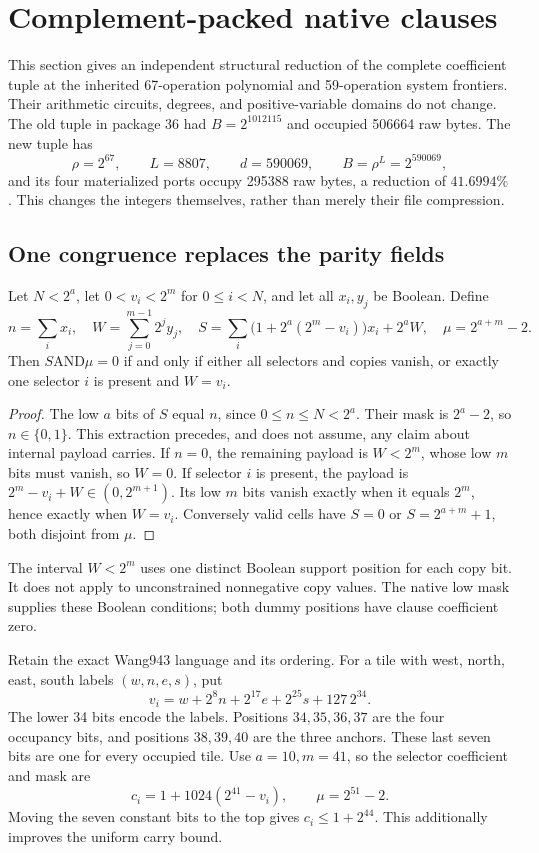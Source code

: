 \section{Complement-packed native clauses}
\label{sec:complement-native}
This section gives an independent structural reduction of the complete
coefficient tuple at the inherited 67-operation polynomial and
59-operation system frontiers.  Their arithmetic circuits, degrees, and
positive-variable domains do not change.  The old tuple in package 36 had
$B=2^{1012115}$ and occupied 506664 raw bytes.  The new tuple has
\[
 \rho=2^{67},\qquad L=8807,\qquad d=590069,\qquad B=\rho^L=2^{590069},
\]
and its four materialized ports occupy 295388 raw bytes, a reduction of
$41.6994\%$.  This changes the integers themselves, rather than merely
their file compression.

\subsection{One congruence replaces the parity fields}
\begin{lemma}
Let $N<2^a$, let $0<v_i<2^m$ for $0\le i<N$, and let all $x_i,y_j$
be Boolean.  Define
\[
 n=\sum_i x_i,\quad W=\sum_{j=0}^{m-1}2^j y_j,\quad
 S=\sum_i\bigl(1+2^a(2^m-v_i)\bigr)x_i+2^aW,
 \quad \mu=2^{a+m}-2.
\]
Then $S\mathbin{\mathrm{AND}}\mu=0$ if and only if either all selectors
and copies vanish, or exactly one selector $i$ is present and $W=v_i$.
\end{lemma}
\begin{proof}
The low $a$ bits of $S$ equal $n$, since $0\le n\le N<2^a$.
Their mask is $2^a-2$, so $n\in\{0,1\}$.  This extraction precedes,
and does not assume, any claim about internal payload carries.
If $n=0$, the remaining payload is $W<2^m$, whose low $m$ bits must
vanish, so $W=0$.  If selector $i$ is present, the payload is
$2^m-v_i+W\in(0,2^{m+1})$.  Its low $m$ bits vanish exactly when it
equals $2^m$, hence exactly when $W=v_i$.  Conversely valid cells have
$S=0$ or $S=2^{a+m}+1$, both disjoint from $\mu$.
\end{proof}
The interval $W<2^m$ uses one distinct Boolean support position for each
copy bit.  It does not apply to unconstrained nonnegative copy values.
The native low mask supplies these Boolean conditions; both dummy
positions have clause coefficient zero.

Retain the exact Wang943 language and its ordering.  For a tile with
west, north, east, south labels $(w,n,e,s)$, put
\[
 v_i=w+2^8n+2^{17}e+2^{25}s+127\,2^{34}.
\]
The lower 34 bits encode the labels.  Positions $34,35,36,37$ are
the four occupancy bits, and positions $38,39,40$ are the three anchors.
These last seven bits are one for every occupied tile.  Use $a=10,m=41$,
so the selector coefficient and mask are
\[
 c_i=1+1024(2^{41}-v_i),\qquad \mu=2^{51}-2.
\]
Moving the seven constant bits to the top gives $c_i\le 1+2^{44}$.
This additionally improves the uniform carry bound.

